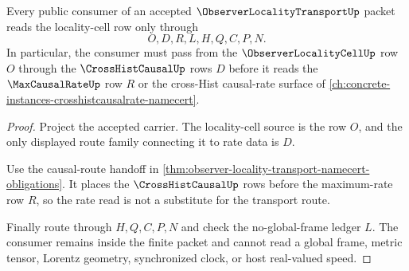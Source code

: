 \begin{theorem}
\label{thm:observer-locality-transport-boundary}
Every public consumer of an accepted $\ObserverLocalityTransportUp$ packet reads the locality-cell row only through
$$
O,D,R,L,H,Q,C,P,N.
$$
In particular, the consumer must pass from the $\ObserverLocalityCellUp$ row $O$ through the $\CrossHistCausalUp$ rows $D$ before it reads the $\MaxCausalRateUp$ row $R$ or the cross-Hist causal-rate surface of \autoref{ch:concrete-instances-crosshistcausalrate-namecert}.
\end{theorem}
\begin{proof}
Project the accepted carrier. The locality-cell source is the row $O$, and the only displayed route family connecting it to rate data is $D$.

Use the causal-route handoff in \autoref{thm:observer-locality-transport-namecert-obligations}. It places the $\CrossHistCausalUp$ rows before the maximum-rate row $R$, so the rate read is not a substitute for the transport route.

Finally route through $H,Q,C,P,N$ and check the no-global-frame ledger $L$. The consumer remains inside the finite packet and cannot read a global frame, metric tensor, Lorentz geometry, synchronized clock, or host real-valued speed.
\end{proof}

